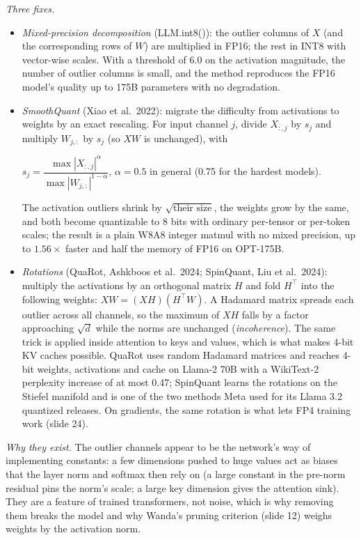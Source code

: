 \documentclass[11pt,letterpaper]{article}
\newenvironment{formulas}{\begin{tcolorbox}[formulabox]}{\end{tcolorbox}}
\begin{document}
\emph{Three fixes.}
\begin{itemize}
  \item \emph{Mixed-precision decomposition} (LLM.int8()): the outlier columns of $X$ (and the corresponding rows of $W$) are multiplied in FP16; the rest in INT8 with vector-wise scales. With a threshold of 6.0 on the activation magnitude, the number of outlier columns is small, and the method reproduces the FP16 model's quality up to 175B parameters with no degradation.
  \item \emph{SmoothQuant} (Xiao et al.\ 2022): migrate the difficulty from activations to weights by an exact rescaling. For input channel $j$, divide $X_{:,j}$ by $s_j$ and multiply $W_{j,:}$ by $s_j$ (so $XW$ is unchanged), with
  \begin{formulas}
  $s_j=\dfrac{\max|X_{:,j}|^{\alpha}}{\max|W_{j,:}|^{1-\alpha}}$, \quad $\alpha=0.5$ in general (0.75 for the hardest models).
  \end{formulas}
  The activation outliers shrink by $\sqrt{\text{their size}}$, the weights grow by the same, and both become quantizable to 8 bits with ordinary per-tensor or per-token scales; the result is a plain W8A8 integer matmul with no mixed precision, up to $1.56\times$ faster and half the memory of FP16 on OPT-175B.
  \item \emph{Rotations} (QuaRot, Ashkboos et al.\ 2024; SpinQuant, Liu et al.\ 2024): multiply the activations by an orthogonal matrix $H$ and fold $H^\top$ into the following weights: $XW=(XH)(H^\top W)$. A Hadamard matrix spreads each outlier across all channels, so the maximum of $XH$ falls by a factor approaching $\sqrt d$ while the norms are unchanged (\emph{incoherence}). The same trick is applied inside attention to keys and values, which is what makes 4-bit KV caches possible. QuaRot uses random Hadamard matrices and reaches 4-bit weights, activations and cache on Llama-2 70B with a WikiText-2 perplexity increase of at most 0.47; SpinQuant learns the rotations on the Stiefel manifold and is one of the two methods Meta used for its Llama 3.2 quantized releases. On gradients, the same rotation is what lets FP4 training work (slide 24).
\end{itemize}

\emph{Why they exist.} The outlier channels appear to be the network's way of implementing constants: a few dimensions pushed to huge values act as biases that the layer norm and softmax then rely on (a large constant in the pre-norm residual pins the norm's scale; a large key dimension gives the attention sink). They are a feature of trained transformers, not noise, which is why removing them breaks the model and why Wanda's pruning criterion (slide 12) weighs weights by the activation norm.
\end{document}

